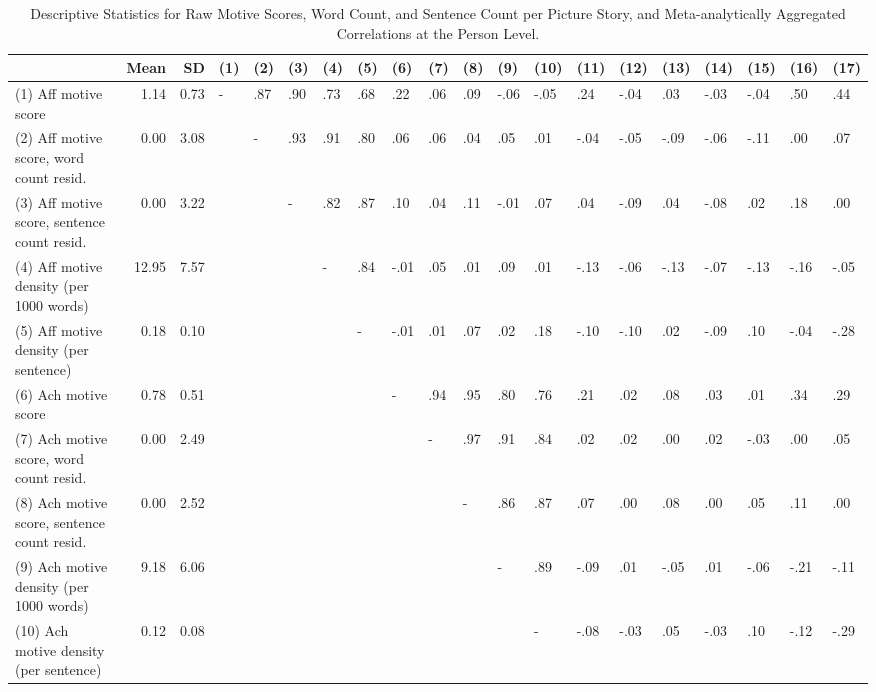 \documentclass[man,a4paper,mask]{apa6}\usepackage[]{graphicx}\usepackage[]{color}
\begin{document}
\begin{table}
	\begin{threeparttable}
		\caption{Descriptive Statistics for Raw Motive Scores, Word Count, and Sentence Count per Picture Story, and Meta-analytically Aggregated Correlations at the Person Level.}
		\label{tab:descCor}
		\footnotesize
		\begin{tabularx}{\textwidth}{Xrrlllllllllllllllll}
		\toprule
 & Mean & SD & (1) & (2) & (3) & (4) & (5) & (6) & (7) & (8) & (9) & (10) & (11) & (12) & (13) & (14) & (15) & (16) & (17) \\ 
  \hline
(1) Aff motive score & 1.14 & 0.73 & - & .87 & .90 & .73 & .68 & .22 & .06 & .09 & -.06 & -.05 & .24 & -.04 & .03 & -.03 & -.04 & .50 & .44 \\ 
  (2) Aff motive score, word count resid. & 0.00 & 3.08 &  & - & .93 & .91 & .80 & .06 & .06 & .04 & .05 & .01 & -.04 & -.05 & -.09 & -.06 & -.11 & .00 & .07 \\ 
  (3) Aff motive score, sentence count resid. & 0.00 & 3.22 &  &  & - & .82 & .87 & .10 & .04 & .11 & -.01 & .07 & .04 & -.09 & .04 & -.08 & .02 & .18 & .00 \\ 
  (4) Aff motive density (per 1000 words) & 12.95 & 7.57 &  &  &  & - & .84 & -.01 & .05 & .01 & .09 & .01 & -.13 & -.06 & -.13 & -.07 & -.13 & -.16 & -.05 \\ 
  (5) Aff motive density (per sentence) & 0.18 & 0.10 &  &  &  &  & - & -.01 & .01 & .07 & .02 & .18 & -.10 & -.10 & .02 & -.09 & .10 & -.04 & -.28 \\ 
  (6) Ach motive score & 0.78 & 0.51 &  &  &  &  &  & - & .94 & .95 & .80 & .76 & .21 & .02 & .08 & .03 & .01 & .34 & .29 \\ 
  (7) Ach motive score, word count resid. & 0.00 & 2.49 &  &  &  &  &  &  & - & .97 & .91 & .84 & .02 & .02 & .00 & .02 & -.03 & .00 & .05 \\ 
  (8) Ach motive score, sentence count resid. & 0.00 & 2.52 &  &  &  &  &  &  &  & - & .86 & .87 & .07 & .00 & .08 & .00 & .05 & .11 & .00 \\ 
  (9) Ach motive density (per 1000 words) & 9.18 & 6.06 &  &  &  &  &  &  &  &  & - & .89 & -.09 & .01 & -.05 & .01 & -.06 & -.21 & -.11 \\ 
  (10) Ach motive density (per sentence) & 0.12 & 0.08 &  &  &  &  &  &  &  &  &  & - & -.08 & -.03 & .05 & -.03 & .10 & -.12 & -.29 \\ 

\end{tabularx}
\end{threeparttable}
\end{table}
\end{document}
